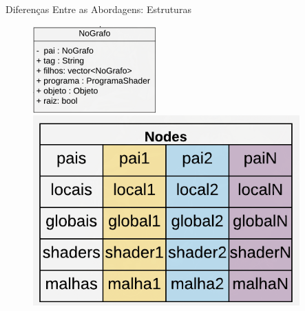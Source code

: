 \documentclass{beamer}
\begin{document}
\begin{frame}{Diferenças Entre as Abordagens: Estruturas}
    \begin{figure}
    \centering
        \begin{minipage}[b]{0.35\textwidth}
            \includegraphics[width=\textwidth]{figuras/nodeood}
        \end{minipage}
        \hspace{1.5cm}
        \begin{minipage}[b]{0.35\textwidth}
            \includegraphics[width=\textwidth]{figuras/nodedod}
        \end{minipage}
    \end{figure}
\end{frame}
\end{document}
